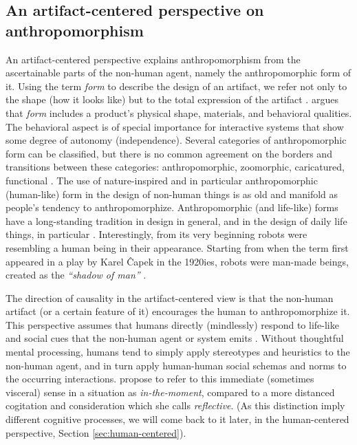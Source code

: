 \documentclass{frontiersSCNS} %
\begin{document}
\subsection{An artifact-centered perspective on anthropomorphism}
\label{sec:anthropomorphic-design}

An artifact-centered perspective explains anthropomorphism from the ascertainable 
parts of the non-human agent, namely the anthropomorphic form of it.
Using the term \textit{form} to describe the design of an artifact, we refer 
not only to the shape (how it looks like) but to the total 
expression of the artifact \citep{bartneck_shaping_2004}. \cite{disalvo_hug:_2003} 
argues that \textit{form} includes a product's physical shape, materials, and 
behavioral qualities. The behavioral aspect is of special importance for interactive 
systems that show some degree of autonomy (independence).
Several categories of anthropomorphic form can be classified, but there is no 
common agreement on the borders and transitions between these categories: 
anthropomorphic, zoomorphic, caricatured, functional \citep{fong_survey_2003}.
The use of nature-inspired and in particular anthropomorphic (human-like) form in the 
design of non-human things is as old and manifold as people's tendency to anthropomorphize. 
Anthropomorphic (and life-like) forms have a long-standing tradition in design in general, and in the design of daily life things, in particular 
\citep{norman_design_1988,guthrie_bottles_2000}. Interestingly, from its very beginning robots were resembling a human being in their appearance. Starting from when the term  first appeared in a play by Karel \^{C}apek in the 1920ies, robots were man-made beings, created as the \textit{``shadow of man''} \citep{replicant_????}.

The direction of causality in the artifact-centered view is that the non-human artifact 
(or a certain feature of it) encourages the human to anthropomorphize it. 
This perspective assumes that humans directly (mindlessly) respond to life-like and social 
cues that the non-human agent or system emits \citep{nass_machines_2000}. Without thoughtful mental processing, 
humans tend to simply apply stereotypes and heuristics to the non-human agent, and in turn apply human-human social schemas and norms to the occurring interactions.
\cite{takayama_perspectives_2012} propose to refer to this immediate (sometimes visceral) sense in a situation as \textit{in-the-moment}, compared to a more distanced cogitation and consideration which she calls \textit{reflective}. (As this distinction imply different cognitive processes, we will come back to it later, in the human-centered perspective, Section \ref{sec:human-centered}). 
\end{document}
